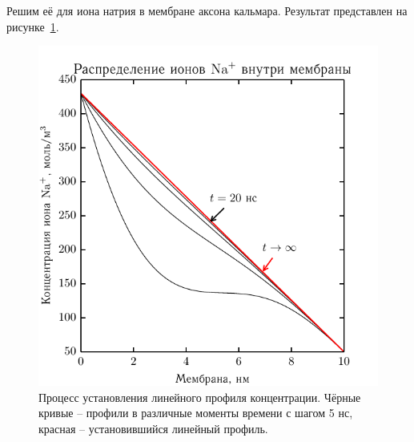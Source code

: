     Решим её для иона натрия в мембране аксона кальмара. Результат представлен
    на рисунке~\ref{fig:2}.
    \begin{figure}[h]
    \begin{center}
        \includegraphics[width=.7\textwidth]{plots/linear_conc}
    \end{center}
    \caption{Процесс установления линейного профиля концентрации. Чёрные кривые
    -- профили в различные моменты времени с шагом 5 нс, красная --
    установившийся линейный профиль.}
    \label{fig:2}
    \end{figure}
\newpage
